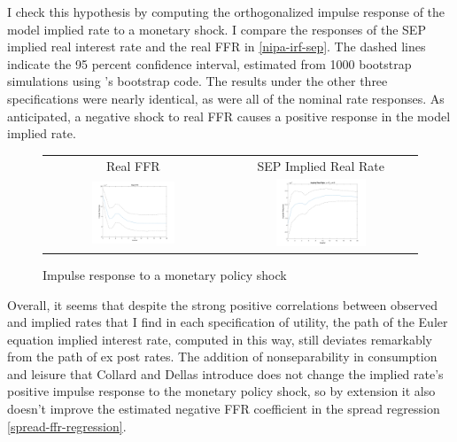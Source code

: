 I check this hypothesis by computing the orthogonalized impulse response of the model implied rate to a monetary shock. I compare the responses of the SEP implied real interest rate and the real FFR in \autoref{nipa-irf-sep}. The dashed lines indicate the 95 percent confidence interval, estimated from 1000 bootstrap simulations using \cite{kilian98}'s bootstrap code.  The results under the other three specifications were nearly identical, as were all of the nominal rate responses. As anticipated, a negative shock to real FFR causes a positive response in the model implied rate.

\begin{figure}[h]
\centering
\begin{tabular}{cc}
Real FFR & SEP Implied Real Rate \\
\includegraphics[width=0.49\textwidth]{figs/nipa/irf/real_ffr} &
\includegraphics[width=0.49\textwidth]{figs/nipa/irf/real_implied_sep}
\end{tabular}
\caption{Impulse response to a monetary policy shock}
\label{nipa-irf-sep}
\end{figure}

Overall, it seems that despite the strong positive correlations between observed and implied rates that I find in each specification of utility, the path of the Euler equation implied interest rate, computed in this way, still deviates remarkably from the path of ex post rates. The addition of nonseparability in consumption and leisure that Collard and Dellas introduce does not change the implied rate's positive impulse response to the monetary policy shock, so by extension it also doesn't improve the estimated negative FFR coefficient in the spread regression \eqref{spread-ffr-regression}.